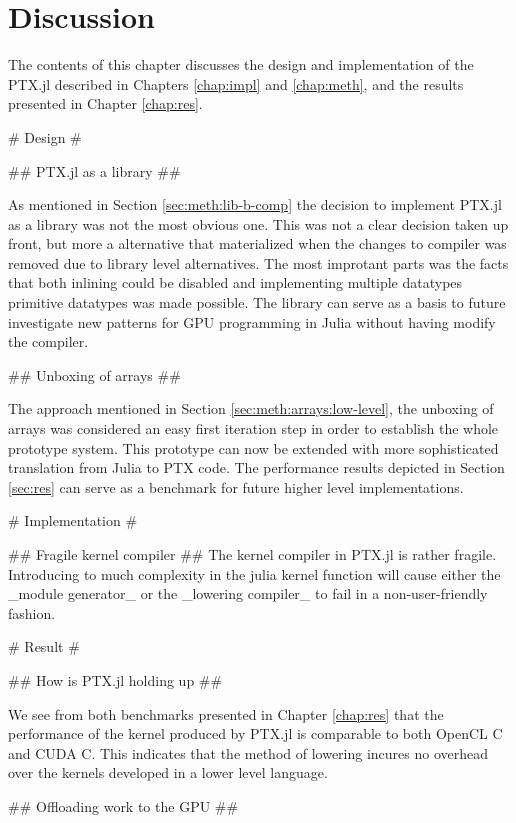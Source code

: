 \chapter{Discussion}
\begin{markdown}

The contents of this chapter discusses the design and implementation
of the PTX.jl described in Chapters \ref{chap:impl} and
\ref{chap:meth}, and the results presented in Chapter \ref{chap:res}.

# Design #

## PTX.jl as a library ##

As mentioned in Section \ref{sec:meth:lib-b-comp} the decision to
implement PTX.jl as a library was not the most obvious one. This was
not a clear decision taken up front, but more a alternative that
materialized when the changes to compiler was removed due to library
level alternatives. The most improtant parts was the facts that both
inlining could be disabled and implementing multiple datatypes
primitive datatypes was made possible. The library can serve as a
basis to future investigate new patterns for GPU programming in Julia
without having modify the compiler.

## Unboxing of arrays ##

The approach mentioned in Section \ref{sec:meth:arrays:low-level}, the
unboxing of arrays was considered an easy first iteration step in
order to establish the whole prototype system. This prototype can now
be extended with more sophisticated translation from Julia to PTX
code. The performance results depicted in Section \ref{sec:res} can
serve as a benchmark for future higher level implementations. 

# Implementation #

## Fragile kernel compiler ##
\label{sec:disc:comp}
The kernel compiler in PTX.jl is rather fragile. Introducing to much
complexity in the julia kernel function will cause either the _module
generator_ or the _lowering compiler_ to fail in a non-user-friendly
fashion.

# Result #

## How is PTX.jl holding up ##

We see from both benchmarks presented in Chapter \ref{chap:res} that
the performance of the kernel produced by PTX.jl is comparable to both
OpenCL C and CUDA C. This indicates that the method of lowering
incures no overhead over the kernels developed in a lower level
language. 

## Offloading work to the GPU ##


\end{markdown}
